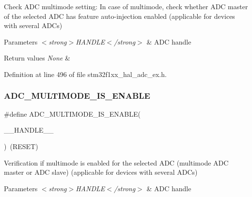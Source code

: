 Check A\+DC multimode setting\+: In case of multimode, check whether A\+DC master of the selected A\+DC has feature auto-\/injection enabled (applicable for devices with several A\+D\+Cs) 


\begin{DoxyParams}{Parameters}
{\em $<$strong$>$\+H\+A\+N\+D\+L\+E$<$/strong$>$} & A\+DC handle \\
\hline
\end{DoxyParams}

\begin{DoxyRetVals}{Return values}
{\em None} & \\
\hline
\end{DoxyRetVals}


Definition at line 496 of file stm32f1xx\+\_\+hal\+\_\+adc\+\_\+ex.\+h.

\mbox{\label{group___a_d_c_ex___private___macro_ga44487b8068ac9f116ab789148f8d48c3}} 
\subsubsection{\texorpdfstring{A\+D\+C\+\_\+\+M\+U\+L\+T\+I\+M\+O\+D\+E\+\_\+\+I\+S\+\_\+\+E\+N\+A\+B\+LE}{ADC\_MULTIMODE\_IS\_ENABLE}}
{\footnotesize\ttfamily \#define A\+D\+C\+\_\+\+M\+U\+L\+T\+I\+M\+O\+D\+E\+\_\+\+I\+S\+\_\+\+E\+N\+A\+B\+LE(\begin{DoxyParamCaption}\item[{}]{\+\_\+\+\_\+\+H\+A\+N\+D\+L\+E\+\_\+\+\_\+ }\end{DoxyParamCaption})~(R\+E\+S\+ET)}



Verification if multimode is enabled for the selected A\+DC (multimode A\+DC master or A\+DC slave) (applicable for devices with several A\+D\+Cs) 


\begin{DoxyParams}{Parameters}
{\em $<$strong$>$\+H\+A\+N\+D\+L\+E$<$/strong$>$} & A\+DC handle \\
\hline
\end{DoxyParams}

